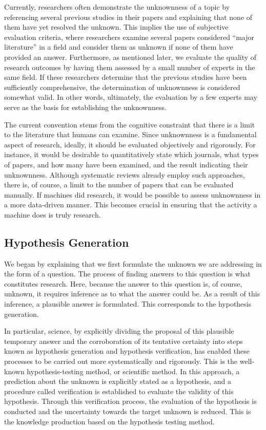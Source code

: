 \documentclass{book}
\begin{document}
Currently, researchers often demonstrate the unknownness of a topic by referencing several previous studies in their papers and explaining that none of them have yet resolved the unknown. This implies the use of subjective evaluation criteria, where researchers examine several papers considered ``major literature'' in a field and consider them as unknown if none of them have provided an answer. Furthermore, as mentioned later, we evaluate the quality of research outcomes by having them assessed by a small number of experts in the same field. If these researchers determine that the previous studies have been sufficiently comprehensive, the determination of unknownness is considered somewhat valid. In other words, ultimately, the evaluation by a few experts may serve as the basis for establishing the unknownness.

The current convention stems from the cognitive constraint that there is a limit to the literature that humans can examine. Since unknownness is a fundamental aspect of research, ideally, it should be evaluated objectively and rigorously. For instance, it would be desirable to quantitatively state which journals, what types of papers, and how many have been examined, and the result indicating their unknownness. Although systematic reviews already employ such approaches, there is, of course, a limit to the number of papers that can be evaluated manually. If machines did research, it would be possible to assess unknownness in a more data-driven manner. This becomes crucial in ensuring that the activity a machine does is truly research.

\subsection{Hypothesis Generation}
We began by explaining that we first formulate the unknown we are addressing in the form of a question. The process of finding answers to this question is what constitutes research. Here, because the answer to this question is, of course, unknown, it requires inference as to what the answer could be. As a result of this inference, a plausible answer is formulated. This corresponds to the hypothesis generation.

In particular, science, by explicitly dividing the proposal of this plausible temporary answer and the corroboration of its tentative certainty into steps known as hypothesis generation and hypothesis verification, has enabled these processes to be carried out more systematically and rigorously. This is the well-known hypothesis-testing method, or scientific method. In this approach, a prediction about the unknown is explicitly stated as a hypothesis, and a procedure called verification is established to evaluate the validity of this hypothesis. Through this verification process, the evaluation of the hypothesis is conducted and the uncertainty towards the target unknown is reduced. This is the knowledge production based on the hypothesis testing method. 
\end{document}
